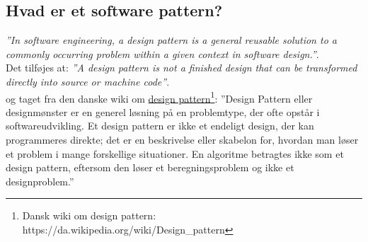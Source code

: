 \subsection{Hvad er et software pattern?}
\textit{''In software engineering, a design pattern is a general reusable solution to a commonly occurring problem within a given context in software design.''}.\\

Det tilføjes at: 
\textit{''A design pattern is not a finished design that can be transformed directly into source or machine code''}.\\

og taget fra den danske wiki om \href{https://da.wikipedia.org/wiki/Design_pattern}{design pattern\footnote{Dansk wiki om design pattern:  \url{https://da.wikipedia.org/wiki/Design_pattern}}}:
''Design Pattern eller designmønster er en generel løsning på en problemtype, der ofte opstår i softwareudvikling. Et design pattern er ikke et endeligt design, der kan programmeres direkte; det er en beskrivelse eller skabelon for, hvordan man løser et problem i mange forskellige situationer. En algoritme betragtes ikke som et design pattern, eftersom den løser et beregningsproblem og ikke et designproblem.''
